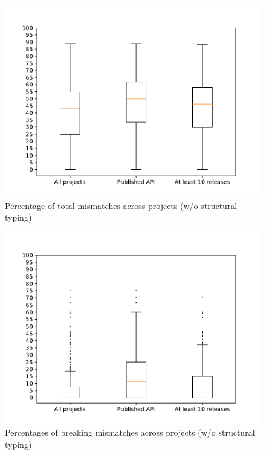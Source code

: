 \documentclass{l4proj}
\begin{document}
\begin{appendices}
\begin{figure}[]
\centering
\caption{Percentage of total mismatches across projects (w/o structural
typing)}
\label{BoxplotsMismatches}
\includegraphics[height=0.4\textheight]{images/evaluation/boxplots_mismatches}
\end{figure}

\begin{figure}[]
\centering
\caption{Percentages of breaking mismatches across projects (w/o
structural typing)}
\label{BoxplotsBreaking}
\includegraphics[height=0.4\textheight]{images/evaluation/boxplots_breaking}
\end{figure}


\end{appendices}
\end{document}
